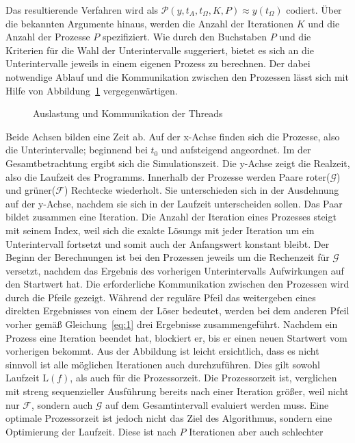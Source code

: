 Das resultierende Verfahren wird als \(\mathcal{P}\!\left(y, t_{A}, t_{\Omega},K,P\right) \approx y(t_\Omega)\) codiert. Über die bekannten Argumente hinaus, werden die Anzahl der Iterationen \(K\) und die Anzahl der Prozesse \(P\) spezifiziert. Wie durch den Buchstaben \(P\) und die Kriterien für die Wahl der Unterintervalle suggeriert, bietet es sich an die Unterintervalle jeweils in einem eigenen Prozess zu berechnen. Der dabei notwendige Ablauf und die Kommunikation zwischen den Prozessen lässt sich mit Hilfe von Abbildung~\ref{fig:sequence} vergegenwärtigen.
\begin{figure}[ht]
    \centering
        
    \caption{Auslastung und Kommunikation der Threads}
    \label{fig:sequence}
\end{figure}
Beide Achsen bilden eine Zeit ab. Auf der x-Achse finden sich die Prozesse, also die Unterintervalle; beginnend bei \(t_0\) und aufsteigend angeordnet. Im der Gesamtbetrachtung ergibt sich die Simulationszeit. Die y-Achse zeigt die Realzeit, also die Laufzeit des Programms. Innerhalb der Prozesse werden Paare roter(\(\mathcal{G}\)) und grüner(\(\mathcal{F}\)) Rechtecke wiederholt. Sie unterschieden sich in der Ausdehnung auf der y-Achse, nachdem sie sich in der Laufzeit unterscheiden sollen. Das Paar bildet zusammen eine Iteration. Die Anzahl der Iteration eines Prozesses steigt mit seinem Index, weil sich die exakte Lösungs mit jeder Iteration um ein Unterintervall fortsetzt und somit auch der Anfangswert konstant bleibt. Der Beginn der Berechnungen ist bei den Prozessen jeweils um die Rechenzeit für \(\mathcal{G}\) versetzt, nachdem das Ergebnis des vorherigen Unterintervalls Aufwirkungen auf den Startwert hat. Die erforderliche Kommunikation zwischen den Prozessen wird durch die Pfeile gezeigt. Während der reguläre Pfeil das weitergeben eines direkten Ergebnisses von einem der Löser bedeutet, werden bei dem anderen Pfeil vorher gemäß Gleichung~\ref{eq:1} drei Ergebnisse zusammengeführt. Nachdem ein Prozess eine Iteration beendet hat, blockiert er, bis er einen neuen Startwert vom vorherigen bekommt. Aus der Abbildung ist leicht ersichtlich, dass es nicht sinnvoll ist alle möglichen Iterationen auch durchzuführen. Dies gilt sowohl Laufzeit \(\mathrm{L}(f)\), als auch für die Prozessorzeit. Die Prozessorzeit ist, verglichen mit streng sequenzieller Ausführung bereits nach einer Iteration größer, weil nicht nur \(\mathcal{F}\), sondern auch \(\mathcal{G}\) auf dem Gesamtintervall evaluiert werden muss. Eine optimale Prozessorzeit ist jedoch nicht das Ziel des Algorithmus, sondern eine Optimierung der Laufzeit. Diese ist nach \(P\) Iterationen aber auch schlechter
